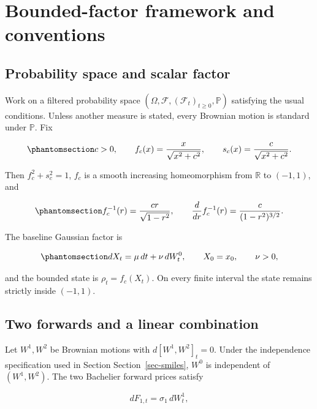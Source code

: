 \documentclass[
  english,
  11pt,
  letterpaper,
  DIV=11,
  numbers=noendperiod]{scrartcl}
\theoremstyle{plain}
\theoremstyle{plain}
\theoremstyle{plain}
\theoremstyle{plain}
\theoremstyle{remark}
\begin{document}
\section{Bounded-factor framework and conventions}\label{sec-framework}

\subsection{Probability space and scalar
factor}\label{probability-space-and-scalar-factor}

Work on a filtered probability space
\((\Omega,\mathcal F,(\mathcal F_t)_{t\ge0},\mathbb P)\) satisfying the
usual conditions. Unless another measure is stated, every Brownian
motion is standard under \(\mathbb P\). Fix

\begin{equation}\protect\phantomsection\label{eq-fs}{
c>0,\qquad
f_c(x)=\frac{x}{\sqrt{x^2+c^2}},
\qquad
s_c(x)=\frac{c}{\sqrt{x^2+c^2}}.
}\end{equation}

Then \(f_c^2+s_c^2=1\), \(f_c\) is a smooth increasing homeomorphism
from \(\mathbb R\) to \((-1,1)\), and

\begin{equation}\protect\phantomsection\label{eq-inverse}{
f_c^{-1}(r)=\frac{cr}{\sqrt{1-r^2}},
\qquad
\frac{d}{dr}f_c^{-1}(r)=\frac{c}{(1-r^2)^{3/2}}.
}\end{equation}

The baseline Gaussian factor is

\begin{equation}\protect\phantomsection\label{eq-factor}{
dX_t=\mu\,dt+\nu\,dW_t^0,\qquad
X_0=x_0,\qquad \nu>0,
}\end{equation}

and the bounded state is \(\rho_t=f_c(X_t)\). On every finite interval
the state remains strictly inside \((-1,1)\).

\subsection{Two forwards and a linear
combination}\label{two-forwards-and-a-linear-combination}

Let \(W^1,W^2\) be Brownian motions with \(d[W^1,W^2]_t=0\). Under the
independence specification used in Section Section~\ref{sec-smiles},
\(W^0\) is independent of \((W^1,W^2)\). The two Bachelier forward
prices satisfy

\[
dF_{1,t}=\sigma_1\,dW_t^1,
\]
\end{document}
